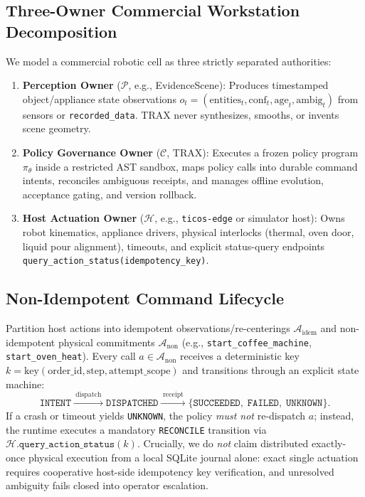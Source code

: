 \documentclass{trax}
\begin{document}
\subsection{Three-Owner Commercial Workstation Decomposition}
We model a commercial robotic cell as three strictly separated authorities:
\begin{enumerate}
    \item \textbf{Perception Owner} ($\mathcal{P}$, e.g., EvidenceScene): Produces timestamped object/appliance state observations $o_t = (\text{entities}_t, \text{conf}_t, \text{age}_t, \text{ambig}_t)$ from sensors or \texttt{recorded\_data}. TRAX never synthesizes, smooths, or invents scene geometry.
    \item \textbf{Policy Governance Owner} ($\mathcal{C}$, TRAX): Executes a frozen policy program $\pi_\theta$ inside a restricted AST sandbox, maps policy calls into durable command intents, reconciles ambiguous receipts, and manages offline evolution, acceptance gating, and version rollback.
    \item \textbf{Host Actuation Owner} ($\mathcal{H}$, e.g., \texttt{ticos-edge} or simulator host): Owns robot kinematics, appliance drivers, physical interlocks (thermal, oven door, liquid pour alignment), timeouts, and explicit status-query endpoints \texttt{query\_action\_status(idempotency\_key)}.
\end{enumerate}

\subsection{Non-Idempotent Command Lifecycle}
Partition host actions into idempotent observations/re-centerings $\mathcal{A}_{\mathrm{idem}}$ and non-idempotent physical commitments $\mathcal{A}_{\mathrm{non}}$ (e.g., \texttt{start\_coffee\_machine}, \texttt{start\_oven\_heat}). Every call $a \in \mathcal{A}_{\mathrm{non}}$ receives a deterministic key $k = \text{key}(\text{order\_id}, \text{step}, \text{attempt\_scope})$ and transitions through an explicit state machine:
\begin{equation}
    \texttt{INTENT} \xrightarrow{\;\text{dispatch}\;} \texttt{DISPATCHED} \xrightarrow{\;\text{receipt}\;} \{\texttt{SUCCEEDED},\; \texttt{FAILED},\; \texttt{UNKNOWN}\}.
\end{equation}
If a crash or timeout yields \texttt{UNKNOWN}, the policy \emph{must not} re-dispatch $a$; instead, the runtime executes a mandatory \texttt{RECONCILE} transition via $\mathcal{H}.\texttt{query\_action\_status}(k)$. Crucially, we do \emph{not} claim distributed exactly-once physical execution from a local SQLite journal alone: exact single actuation requires cooperative host-side idempotency key verification, and unresolved ambiguity fails closed into operator escalation.
\end{document}

